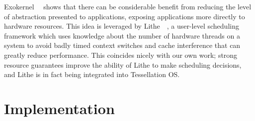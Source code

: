 \documentclass[letterpaper,twocolumn,11pt]{article}
\begin{document}
Exokernel~\cite{Engler:1995:EOS:224056.224076}~\cite{Engler:1995:EOS:224057.224076} shows that there can be considerable benefit from reducing the level of abstraction presented to applications, exposing applications more directly to hardware resources. This idea is leveraged by Lithe~\cite{Pan:2010:CPS:1809028.1806639}~\cite{Pan:2010:CPS:1806596.1806639}, a user-level scheduling framework which uses knowledge about the number of hardware threads on a system to avoid badly timed context switches and cache interference that can greatly reduce performance. This coincides nicely with our own work; strong resource guarantees improve the ability of Lithe to make scheduling decisions, and Lithe is in fact being integrated into Tessellation OS.

\section{Implementation}
\end{document}
